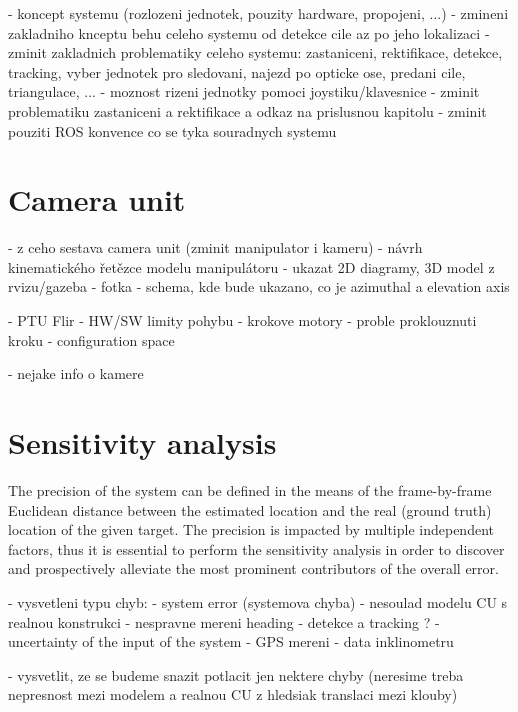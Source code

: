 - koncept systemu (rozlozeni jednotek, pouzity hardware, propojeni, ...)
- zmineni zakladniho knceptu behu celeho systemu od detekce cile az po jeho lokalizaci
- zminit zakladnich problematiky celeho systemu: zastaniceni, rektifikace, detekce, tracking, vyber jednotek pro sledovani, najezd po opticke ose, predani cile, triangulace, ...
- moznost rizeni jednotky pomoci joystiku/klavesnice
- zminit problematiku zastaniceni a rektifikace a odkaz na prislusnou kapitolu
- zminit pouziti ROS konvence co se tyka souradnych systemu

\chapter{Camera unit} \label{txt:camera_unit}

- z ceho sestava camera unit (zminit manipulator i kameru)
- návrh kinematického řetězce modelu manipulátoru
- ukazat 2D diagramy, 3D model z rvizu/gazeba
- fotka
- schema, kde bude ukazano, co je azimuthal a elevation axis

- PTU Flir
	- HW/SW limity pohybu
	- krokove motory
	- proble proklouznuti kroku
	- configuration space \cite{Russell:2009:AIM:1671238}

- nejake info o kamere


\chapter{Sensitivity analysis} \label{txt:sensitivity_analysis}
The precision of the system can be defined in the means of the frame-by-frame Euclidean distance between the estimated location and the real (ground truth) location of the given target. The precision is impacted by multiple independent factors, thus it is essential to perform the sensitivity analysis in order to discover and prospectively alleviate the most prominent contributors of the overall error. 

- vysvetleni typu chyb:
	- system error (systemova chyba)
		- nesoulad modelu CU s realnou konstrukci
		- nespravne mereni heading
		- detekce a tracking ?
	- uncertainty of the input of the system
		- GPS mereni
		- data inklinometru
	
- vysvetlit, ze se budeme snazit potlacit jen nektere chyby (neresime treba nepresnost mezi modelem a realnou CU z hledsiak translaci mezi klouby)

